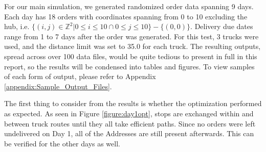 \documentclass[letterpaper]{article}
\begin{document}

    For our main simulation, we generated randomized order data spanning 9 days. Each day has 18 orders with coordinates spanning from 0 to 10 excluding the hub, i.e. $\{ (i, j) \in \mathbb{Z}^2 | 0 \leq i \leq 10 \cap 0 \leq j \leq 10\} - \{ (0, 0)\}$. Delivery due dates range from 1 to 7 days after the order was generated. For this test, 3 trucks were used, and the distance limit was set to 35.0 for each truck. The resulting outputs, spread across over 100 data files, would be quite tedious to present in full in this report, so the results will be condensed into tables and figures. To view samples of each form of output, please refer to Appendix \ref{appendix:Sample_Output_Files}.

    The first thing to consider from the results is whether the optimization performed as expected. As seen in Figure \ref{figure:day1opt}, stops are exchanged within and between truck routes until they all take efficient paths. Since no orders were left undelivered on Day 1, all of the Addresses are still present afterwards. This can be verified for the other days as well.
\end{document}

